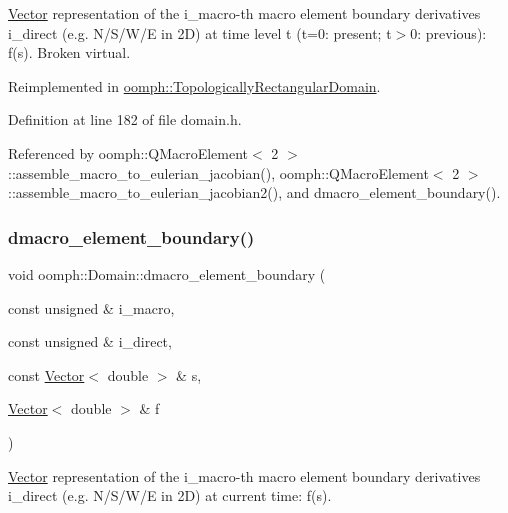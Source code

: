 \hyperlink{classoomph_1_1Vector}{Vector} representation of the i\+\_\+macro-\/th macro element boundary derivatives i\+\_\+direct (e.\+g. N/\+S/\+W/E in 2D) at time level t (t=0\+: present; t$>$0\+: previous)\+: f(s). Broken virtual. 



Reimplemented in \hyperlink{classoomph_1_1TopologicallyRectangularDomain_a218b22a016e2f330d6b90354597d9786}{oomph\+::\+Topologically\+Rectangular\+Domain}.



Definition at line 182 of file domain.\+h.



Referenced by oomph\+::\+Q\+Macro\+Element$<$ 2 $>$\+::assemble\+\_\+macro\+\_\+to\+\_\+eulerian\+\_\+jacobian(), oomph\+::\+Q\+Macro\+Element$<$ 2 $>$\+::assemble\+\_\+macro\+\_\+to\+\_\+eulerian\+\_\+jacobian2(), and dmacro\+\_\+element\+\_\+boundary().

\mbox{\label{classoomph_1_1Domain_a6973f0ef86b83c6cadcd722374c62270}} 
\subsubsection{\texorpdfstring{dmacro\+\_\+element\+\_\+boundary()}{dmacro\_element\_boundary()}\hspace{0.1cm}{\footnotesize\ttfamily [2/2]}}
{\footnotesize\ttfamily void oomph\+::\+Domain\+::dmacro\+\_\+element\+\_\+boundary (\begin{DoxyParamCaption}\item[{const unsigned \&}]{i\+\_\+macro,  }\item[{const unsigned \&}]{i\+\_\+direct,  }\item[{const \hyperlink{classoomph_1_1Vector}{Vector}$<$ double $>$ \&}]{s,  }\item[{\hyperlink{classoomph_1_1Vector}{Vector}$<$ double $>$ \&}]{f }\end{DoxyParamCaption})\hspace{0.3cm}{\ttfamily [inline]}}



\hyperlink{classoomph_1_1Vector}{Vector} representation of the i\+\_\+macro-\/th macro element boundary derivatives i\+\_\+direct (e.\+g. N/\+S/\+W/E in 2D) at current time\+: f(s). 



